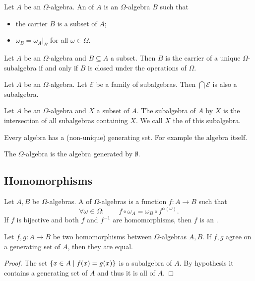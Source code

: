 \begin{definition}
Let $A$ be an $\Omega$-algebra. An  of $A$ is an $\Omega$-algebra $B$ such that
\begin{itemize}
\item the carrier $B$ is a subset of $A$;
\item $\omega_B = \omega_A|_B$ for all $\omega\in \Omega$.
\end{itemize}
\end{definition}

\begin{lemma}
Let $A$ be an $\Omega$-algebra and $B\subseteq A$ a subset. Then $B$ is the carrier of a unique $\Omega$-subalgebra \textup{if and only if} $B$ is closed under the operations of $\Omega$.
\end{lemma}

\begin{lemma} \label{intersectionSubalgebra}
Let $A$ be an $\Omega$-algebra. Let $\mathcal{E}$ be a family of subalgebras. Then $\bigcap \mathcal{E}$ is also a subalgebra. 
\end{lemma}

\begin{definition}
Let $A$ be an $\Omega$-algebra and $X$ a subset of $A$. The subalgebra of $A$  by $X$ is the intersection of all subalgebras containing $X$. We call $X$ the  of this subalgebra.
\end{definition}
Every algebra has a (non-unique) generating set. For example the algebra itself.

\begin{definition}
The  $\Omega$-algebra is the algebra generated by $\emptyset$.
\end{definition}

\subsection{Homomorphisms}
\begin{definition}
Let $A,B$ be $\Omega$-algebras. A  of $\Omega$-algebras is a function $f:A\to B$ such that
\[ \forall \omega\in\Omega: \qquad f\circ \omega_A = \omega_B\circ f^{\alpha(\omega)}. \]
If $f$ is bijective and both $f$ and $f^{-1}$ are homomorphisms, then $f$ is an .
\end{definition}

\begin{proposition}
Let $f,g:A\to B$ be two homomorphisms between $\Omega$-algebras $A,B$. If $f,g$ agree on a generating set of $A$, then they are equal.
\end{proposition}
\begin{proof}
The set $\setbuilder{x\in A}{f(x) = g(x)}$ is a subalgebra of $A$. By hypothesis it contains a generating set of $A$ and thus it is all of $A$.
\end{proof}

